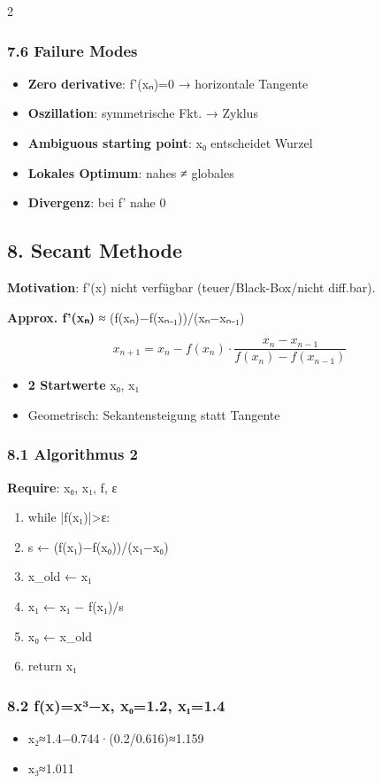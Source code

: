 \documentclass[10pt, a4paper]{article}
\begin{document}
\begin{multicols}{2}
\subsubsection{7.6 Failure Modes}
\begin{itemize}
  \item \textbf{Zero derivative}: f'(xₙ)=0 → horizontale Tangente
  \item \textbf{Oszillation}: symmetrische Fkt. → Zyklus
  \item \textbf{Ambiguous starting point}: x₀ entscheidet Wurzel
  \item \textbf{Lokales Optimum}: nahes ≠ globales
  \item \textbf{Divergenz}: bei f' nahe 0
\end{itemize}


\subsection{8. Secant Methode}

\textbf{Motivation}: f'(x) nicht verfügbar (teuer/Black-Box/nicht diff.bar).

\textbf{Approx. f'(xₙ)} ≈ (f(xₙ)−f(xₙ₋₁))/(xₙ−xₙ₋₁)


\[
x_{n+1}=x_n-f(x_n)\cdot\frac{x_n-x_{n-1}}{f(x_n)-f(x_{n-1})}
\]


\begin{itemize}
  \item \textbf{2 Startwerte} x₀, x₁
  \item Geometrisch: Sekantensteigung statt Tangente
\end{itemize}


\subsubsection{8.1 Algorithmus 2}
\textbf{Require}: x₀, x₁, f, ε

\begin{enumerate}
  \item while |f(x₁)|>ε:
  \item   s ← (f(x₁)−f(x₀))/(x₁−x₀)
  \item   x\_old ← x₁
  \item   x₁ ← x₁ − f(x₁)/s
  \item   x₀ ← x\_old
  \item return x₁
\end{enumerate}


\subsubsection{8.2 f(x)=x³−x, x₀=1.2, x₁=1.4}
\begin{itemize}
  \item x₂≈1.4−0.744·(0.2/0.616)≈1.159
  \item x₃≈1.011
\end{itemize}



\end{multicols}
\end{document}
